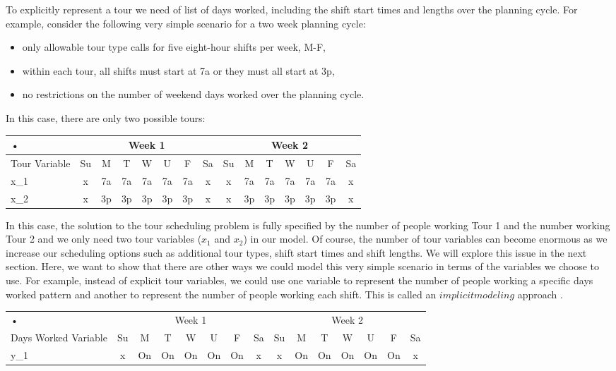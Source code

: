 \documentclass{article}
\begin{document}
To explicitly represent a tour we need of list of days worked, including the shift start times and lengths over the planning cycle. For example, consider the following very simple scenario for a two week planning cycle:

\begin{itemize}
\item only allowable tour type calls for five eight-hour shifts per week, M-F,
\item within each tour, all shifts must start at 7a or they must all start at 3p,
\item no restrictions on the number of weekend days worked over the planning cycle.
\end{itemize}

In this case, there are only two possible tours:

\begin{tabular}{|l|c|c|c|c|c|c|c|c|c|c|c|c|c|c|}
\hline 
• & \multicolumn{7}{c|}{Week 1} & \multicolumn{7}{c|}{Week 2} \\ 
\hline 
Tour Variable & Su & M & T & W & U & F & Sa & Su & M & T & W & U & F & Sa \\ 
\hline 
x_1 & x & 7a & 7a & 7a & 7a & 7a & x & x & 7a & 7a & 7a & 7a & 7a & x \\ 
\hline 
x_2 & x & 3p & 3p & 3p & 3p & 3p & x & x & 3p & 3p & 3p & 3p & 3p & x \\ 
\hline 
\end{tabular} 

In this case, the solution to the tour scheduling problem is fully specified by the number of people working Tour 1 and the number working Tour 2 and we only need two tour variables ($x_1$ and $x_2$) in our model. Of course, the number of tour variables can become enormous as we increase our scheduling options such as additional tour types, shift start times and shift lengths. We will explore this issue in the next section. Here, we want to show that there are other ways we could model this very simple scenario in terms of the variables we choose to use. For example, instead of explicit tour variables, we could use one variable to represent the number of people working a specific days worked pattern and another to represent the number of people working each shift. This is called an $implicit modeling$ approach \cite{}.

\begin{tabular}{|l|c|c|c|c|c|c|c|c|c|c|c|c|c|c|}
\hline 
• & \multicolumn{7}{c|}{Week 1} & \multicolumn{7}{c|}{Week 2} \\  
Days Worked Variable & Su & M & T & W & U & F & Sa & Su & M & T & W & U & F & Sa \\ 
\hline 
y_1 & x & On & On & On & On & On & x & x & On & On & On & On & On & x \\  
\hline 
\end{tabular}
\end{document}
